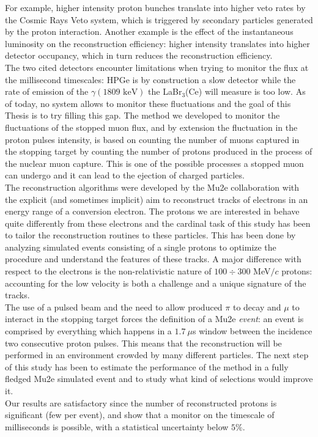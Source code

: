 \documentclass[12pt,a4paper,openright, oneside, titlepage]{book} %
\begin{document}
\begin{changemargin}{1cm}{1cm}
For example, higher intensity proton bunches translate into higher veto rates by the Cosmic Rays Veto system, 
which is triggered by secondary particles generated by the proton interaction. 
Another example is the effect of the instantaneous luminosity on the reconstruction efficiency: higher intensity translates into higher detector occupancy, which in turn reduces the reconstruction efficiency.\\
The two cited detectors encounter limitations when trying to monitor the flux at the millisecond timescales: HPGe is by construction a slow detector while the rate of emission of the $\gamma (1809\textrm{ keV})$ the LaBr$_3$(Ce) will measure is too low.
As of today, no system allows to monitor these fluctuations and the goal of this Thesis is to try filling this gap.
The method we developed to monitor the fluctuations of the stopped muon flux, and by extension the fluctuation in the proton pulses intensity, is based on counting the number of muons captured in the stopping target by counting the number of protons produced in the process of the nuclear muon capture.
This is one of the possible processes a stopped muon can undergo and it can lead to the ejection of charged particles.\\
The reconstruction algorithms were developed by the Mu2e collaboration with the explicit (and sometimes implicit) aim to reconstruct tracks of electrons in an energy range of a conversion electron. 
The protons we are interested in behave quite differently from these electrons and the cardinal task of this study has been to tailor the reconstruction routines to these particles. 
This has been done by analyzing simulated events consisting of a single protons to optimize the procedure and understand the features of these tracks. 
A major difference with respect to the electrons is the non-relativistic nature of $100\div300$ MeV$/c$ protons: accounting for the low velocity is both a challenge and a unique signature of the tracks.\\
The use of a pulsed beam and the need to allow produced $\pi$ to decay and $\mu$ to interact in the stopping target forces the definition of a Mu2e \textit{event}: an event is comprised by everything which happens in a $1.7\ \mu$s window between the incidence two consecutive proton pulses.
This means that the reconstruction will be performed in an environment crowded by many different particles.
The next step of this study has been to estimate the performance of the method in a fully fledged Mu2e simulated event and to study what kind of selections would improve it.\\
Our results are satisfactory since the number of reconstructed protons is significant (few per event), and show that a monitor on the timescale of milliseconds is possible, with a statistical uncertainty below $5\%$.

\end{changemargin}
\end{document}
